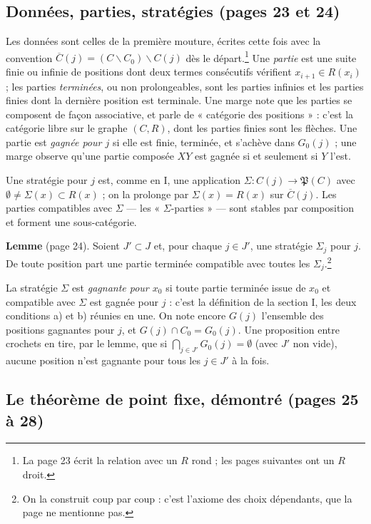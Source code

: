 \documentclass[11pt,a4paper]{article}
\begin{document}
\subsection*{Données, parties, stratégies (pages 23 et 24)}

Les données sont celles de la première mouture, écrites cette fois avec la
convention $\overline{C}(j) = (C \smallsetminus C_0) \smallsetminus C(j)$
dès le départ.\footnote{La page 23 écrit la relation avec un $R$ rond ; les
pages suivantes ont un $R$ droit.} Une \emph{partie} est une suite finie ou
infinie de positions dont deux termes consécutifs vérifient
$x_{i+1} \in R(x_i)$ ; les parties \emph{terminées}, ou non prolongeables,
sont les parties infinies et les parties finies dont la dernière position est
terminale. Une marge note que les parties se composent de façon associative,
et parle de « catégorie des positions » : c'est la catégorie libre sur le
graphe $(C, R)$, dont les parties finies sont les flèches. Une partie est
\emph{gagnée pour $j$} si elle est finie, terminée, et s'achève dans
$G_0(j)$ ; une marge observe qu'une partie composée $XY$ est gagnée si et
seulement si $Y$ l'est.

Une stratégie pour $j$ est, comme en I, une application
$\Sigma : C(j) \to \mathfrak{P}(C)$ avec
$\emptyset \neq \Sigma(x) \subset R(x)$ ; on la prolonge par
$\Sigma(x) = R(x)$ sur $\overline{C}(j)$. Les parties compatibles avec
$\Sigma$ --- les « $\Sigma$-parties » --- sont stables par composition et
forment une sous-catégorie.

\textbf{Lemme} (page 24). Soient $J' \subset J$ et, pour chaque $j \in J'$,
une stratégie $\Sigma_j$ pour $j$. De toute position part une partie
terminée compatible avec toutes les $\Sigma_j$.\footnote{On la construit coup
par coup : c'est l'axiome des choix dépendants, que la page ne mentionne
pas.}

La stratégie $\Sigma$ est \emph{gagnante pour $x_0$} si toute partie
terminée issue de $x_0$ et compatible avec $\Sigma$ est gagnée pour $j$ :
c'est la définition de la section I, les deux conditions a) et b) réunies en
une. On note encore $G(j)$ l'ensemble des positions gagnantes pour $j$, et
$G(j) \cap C_0 = G_0(j)$. Une proposition entre crochets en tire, par le
lemme, que si $\bigcap_{j \in J'} G_0(j) = \emptyset$ (avec $J'$ non vide),
aucune position n'est gagnante pour tous les $j \in J'$ à la fois.

\subsection*{Le théorème de point fixe, démontré (pages 25 à 28)}
\end{document}
